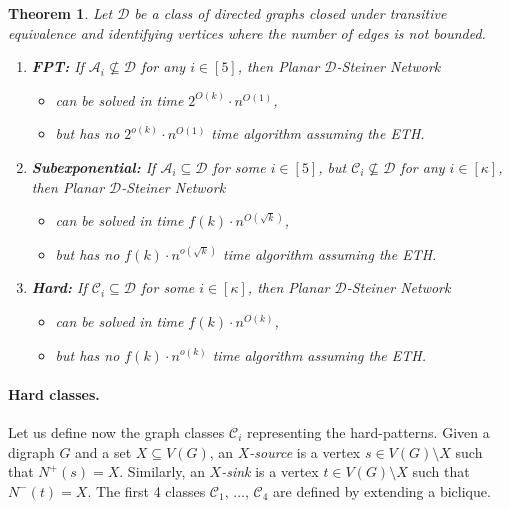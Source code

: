 \documentclass[a4paper,11pt]{article}
\newcommand{\calD}{\mathcal{D}}
\theoremstyle{plain}
\newtheorem{theorem}{Theorem}[section]
\newtheorem{identification rule}{Identification Rule}
\theoremstyle{definition}
\theoremstyle{remark}
\newcommand{\Dsnfull}{{\sc Planar $\calD$-Steiner Network}\xspace}
\newcommand{\oldC}{\mathcal{A}}
\begin{document}
\begin{mdframed}[style=highlight,frametitle={Our main result}] 
\begin{theorem}\label{thm:main-intro}
  Let $\calD$ be a class of directed graphs closed under transitive equivalence and identifying vertices where the number of edges is not bounded.
  \begin{enumerate}
  \item \textbf{FPT:}   If $\oldC_i\not\subseteq \calD$ for any $i\in [5]$, then \Dsnfull
    \begin{itemize}
    \item[(i)] can be solved in time $2^{O(k)}\cdot n^{O(1)}$,
    \item[(ii)] but has no $2^{o(k)}\cdot n^{O(1)}$ time algorithm assuming the ETH.
    \end{itemize}
  \item \textbf{Subexponential:}   If $\oldC_i\subseteq\calD$ for some $i\in [5]$, but $\mathcal{C}_i\not\subseteq \calD$ for any $i\in[\kappa]$, then \Dsnfull
    \begin{itemize}
    \item[(iii)] can be solved in time $f(k) \cdot n^{O(\sqrt{k})}$,
      \item[(iv)] but has no
        $f(k) \cdot n^{o(\sqrt{k})}$ time algorithm assuming the ETH.
      \end{itemize}
    \item \textbf{Hard:} If $\mathcal{C}_i\subseteq \calD$ for some $i\in [\kappa]$, then \Dsnfull
      \begin{itemize}
      \item[(v)]  can be solved in time $f(k)\cdot n^{O({k})}$,
        \item[(vi)] but has no $f(k) \cdot n^{o({k})}$ time algorithm assuming the ETH.
        \end{itemize}
      \end{enumerate}
    \end{theorem}
  \end{mdframed}

\paragraph{Hard classes.}
Let us define now the graph classes $\mathcal{C}_i$ representing the hard-patterns. Given a digraph $G$ and a set $X \subseteq V(G)$, an \emph{$X$-source} is a vertex $s \in V(G) \setminus X$ such that $N^+(s) = X$.
Similarly, an \emph{$X$-sink} is a vertex $t \in V(G) \setminus X$ such that $N^-(t) = X$.
The first 4 classes $\mathcal{C}_1$, $\dots$, $\mathcal{C}_4$ are defined by extending a biclique.
\end{document}
